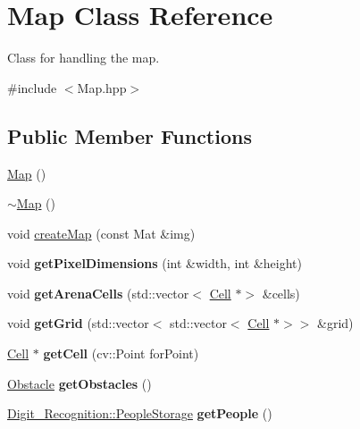 \hypertarget{class_map}{}\section{Map Class Reference}
\label{class_map}


Class for handling the map.  




{\ttfamily \#include $<$Map.\+hpp$>$}

\subsection*{Public Member Functions}
\begin{DoxyCompactItemize}
\item 
\mbox{\hyperlink{class_map_a0f5ad0fd4563497b4214038cbca8b582}{Map}} ()
\item 
\mbox{\hyperlink{class_map_aa403fbe09394ccf39747588f5168e3b2}{$\sim$\+Map}} ()
\item 
void \mbox{\hyperlink{class_map_a02537656e91e97077dfdfc5d84c3027b}{create\+Map}} (const Mat \&img)
\item 
\mbox{\label{class_map_aaba4246a4400e03db7218828402994df}} 
void {\bfseries get\+Pixel\+Dimensions} (int \&width, int \&height)
\item 
\mbox{\label{class_map_a8eb8b7841ba4ccf02646fe2c288c7fc5}} 
void {\bfseries get\+Arena\+Cells} (std\+::vector$<$ \mbox{\hyperlink{class_cell}{Cell}} $\ast$$>$ \&cells)
\item 
\mbox{\label{class_map_a0bc04be78a3badfaa364bc3f48fbfdfe}} 
void {\bfseries get\+Grid} (std\+::vector$<$ std\+::vector$<$ \mbox{\hyperlink{class_cell}{Cell}} $\ast$$>$$>$ \&grid)
\item 
\mbox{\label{class_map_adf1aceac80d4cbfc91a5cf158c009c9d}} 
\mbox{\hyperlink{class_cell}{Cell}} $\ast$ {\bfseries get\+Cell} (cv\+::\+Point for\+Point)
\item 
\mbox{\label{class_map_a17022b64f602dfd4d45a84c0ffa92270}} 
\mbox{\hyperlink{class_obstacle}{Obstacle}} {\bfseries get\+Obstacles} ()
\item 
\mbox{\label{class_map_a8b8801b63526341b3ba9da76d26c539a}} 
\mbox{\hyperlink{struct_image_processing_1_1_digit___recognition_1_1_people_storage}{Digit\+\_\+\+Recognition\+::\+People\+Storage}} {\bfseries get\+People} ()
$$
\end{DoxyCompactItemize}
